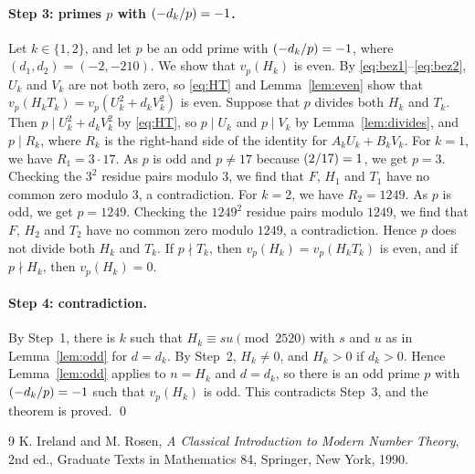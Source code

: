 \documentclass[11pt]{article}
\newcommand{\leg}[2]{\mathchoice{\biggl(\dfrac{#1}{#2}\biggr)}{(#1/#2)}{(#1/#2)}{(#1/#2)}}
\begin{document}
\paragraph{Step 3: primes $p$ with $\leg{-d_k}{p}=-1$.} Let $k\in\{1,2\}$, and let $p$ be an odd prime with $\leg{-d_k}{p}=-1$, where $(d_{1},d_{2})=(-2,-210)$. We show that $v_p(H_k)$ is even. By \eqref{eq:bez1}--\eqref{eq:bez2}, $U_k$ and $V_k$ are not both zero, so \eqref{eq:HT} and Lemma~\ref{lem:even} show that $v_p(H_kT_k)=v_p(U_k^2+d_kV_k^2)$ is even. Suppose that $p$ divides both $H_k$ and $T_k$. Then $p\mid U_k^2+d_kV_k^2$ by \eqref{eq:HT}, so $p\mid U_k$ and $p\mid V_k$ by Lemma~\ref{lem:divides}, and $p\mid R_k$, where $R_k$ is the right-hand side of the identity for $A_kU_k+B_kV_k$. For $k=1$, we have $R_{1}=3\cdot 17$. As $p$ is odd and $p\neq17$ because $\leg{2}{17}=1$, we get $p=3$. Checking the $3^2$ residue pairs modulo $3$, we find that $F$, $H_{1}$ and $T_{1}$ have no common zero modulo $3$, a contradiction. For $k=2$, we have $R_{2}=1249$. As $p$ is odd, we get $p=1249$. Checking the $1249^2$ residue pairs modulo $1249$, we find that $F$, $H_{2}$ and $T_{2}$ have no common zero modulo $1249$, a contradiction. Hence $p$ does not divide both $H_k$ and $T_k$. If $p\nmid T_k$, then $v_p(H_k)=v_p(H_kT_k)$ is even, and if $p\nmid H_k$, then $v_p(H_k)=0$.

\paragraph{Step 4: contradiction.} By Step~1, there is $k$ such that $H_k\equiv su\pmod{2520}$ with $s$ and $u$ as in Lemma~\ref{lem:odd} for $d=d_k$. By Step~2, $H_k\neq0$, and $H_k>0$ if $d_k>0$. Hence Lemma~\ref{lem:odd} applies to $n=H_k$ and $d=d_k$, so there is an odd prime $p$ with $\leg{-d_k}{p}=-1$ such that $v_p(H_k)$ is odd. This contradicts Step~3, and the theorem is proved.
\qed

\begin{thebibliography}{9}
 K. Ireland and M. Rosen, \emph{A Classical Introduction to Modern Number Theory}, 2nd ed., Graduate Texts in Mathematics 84, Springer, New York, 1990.
\end{thebibliography}
\end{document}
